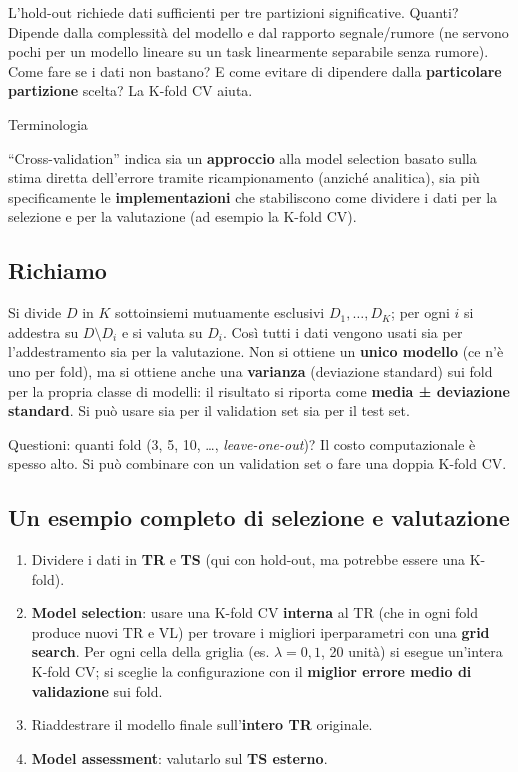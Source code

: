 L'hold-out richiede dati sufficienti per tre partizioni significative.
Quanti? Dipende dalla complessità del modello e dal rapporto
segnale/rumore (ne servono pochi per un modello lineare su un task
linearmente separabile senza rumore). Come fare se i dati non bastano? E
come evitare di dipendere dalla \textbf{particolare partizione} scelta?
La K-fold CV aiuta.

\begin{boxnote}{Terminologia}

``Cross-validation'' indica sia un \textbf{approccio} alla model
selection basato sulla stima diretta dell'errore tramite ricampionamento
(anziché analitica), sia più specificamente le \textbf{implementazioni}
che stabiliscono come dividere i dati per la selezione e per la
valutazione (ad esempio la K-fold CV).

\end{boxnote}

\subsection{Richiamo}\label{richiamo}

Si divide \(D\) in \(K\) sottoinsiemi mutuamente esclusivi
\(D_1,\dots,D_K\); per ogni \(i\) si addestra su \(D \setminus D_i\) e
si valuta su \(D_i\). Così tutti i dati vengono usati sia per
l'addestramento sia per la valutazione. Non si ottiene un \textbf{unico
modello} (ce n'è uno per fold), ma si ottiene anche una
\textbf{varianza} (deviazione standard) sui fold per la propria classe
di modelli: il risultato si riporta come \textbf{media ± deviazione
standard}. Si può usare sia per il validation set sia per il test set.

Questioni: quanti fold (3, 5, 10, \ldots, \emph{leave-one-out})? Il
costo computazionale è spesso alto. Si può combinare con un validation
set o fare una doppia K-fold CV.

\subsection{Un esempio completo di selezione e
valutazione}\label{un-esempio-completo-di-selezione-e-valutazione}

\begin{enumerate}
\def\labelenumi{\arabic{enumi}.}
\tightlist
\item
  Dividere i dati in \textbf{TR} e \textbf{TS} (qui con hold-out, ma
  potrebbe essere una K-fold).
\item
  \textbf{Model selection}: usare una K-fold CV \textbf{interna} al TR
  (che in ogni fold produce nuovi TR e VL) per trovare i migliori
  iperparametri con una \textbf{grid search}. Per ogni cella della
  griglia (es. \(\lambda = 0{,}1\), 20 unità) si esegue un'intera K-fold
  CV; si sceglie la configurazione con il \textbf{miglior errore medio
  di validazione} sui fold.
\item
  Riaddestrare il modello finale sull'\textbf{intero TR} originale.
\item
  \textbf{Model assessment}: valutarlo sul \textbf{TS esterno}.
\end{enumerate}

